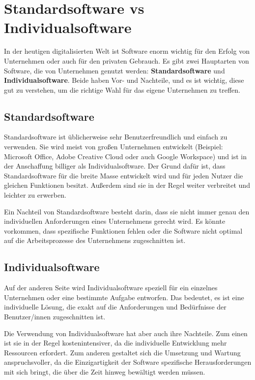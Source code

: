 \section {Standardsoftware vs Individualsoftware}

In der heutigen digitalisierten Welt ist Software enorm wichtig für den Erfolg von Unternehmen 
oder auch für den privaten Gebrauch.
Es gibt zwei Hauptarten von Software, die von Unternehmen genutzt werden: \textbf{Standardsoftware} und 
\textbf{Individualsoftware}.
Beide haben Vor- und Nachteile, und es ist wichtig, 
diese gut zu verstehen, um die richtige Wahl für das eigene Unternehmen zu treffen.

\subsection*{Standardsoftware}

Standardsoftware ist üblicherweise sehr Benutzerfreundlich und einfach zu verwenden. 
Sie wird meist von großen Unternehmen entwickelt 
(Beispiel: Microsoft Office, Adobe Creative Cloud oder auch Google Workspace) 
und ist in der Anschaffung billiger als Individualsoftware. 
Der Grund dafür ist, dass Standardsoftware für die breite Masse entwickelt wird 
und für jeden Nutzer die gleichen Funktionen besitzt. 
Außerdem sind sie in der Regel weiter verbreitet und leichter zu erwerben.

Ein Nachteil von Standardsoftware besteht darin, dass sie nicht immer genau 
den individuellen Anforderungen eines Unternehmens gerecht wird. 
Es könnte vorkommen, dass spezifische Funktionen fehlen oder die Software 
nicht optimal auf die Arbeitsprozesse des Unternehmens zugeschnitten ist. 
\newpage
\subsection*{Individualsoftware}

Auf der anderen Seite wird Individualsoftware speziell für ein einzelnes 
Unternehmen oder eine bestimmte Aufgabe entworfen. 
Das bedeutet, es ist eine individuelle Lösung, die exakt auf 
die Anforderungen und Bedürfnisse der Benutzer/innen zugeschnitten ist.

Die Verwendung von Individualsoftware hat aber auch ihre Nachteile. 
Zum einen ist sie in der Regel kostenintensiver, da die individuelle Entwicklung 
mehr Ressourcen erfordert. Zum anderen gestaltet sich die Umsetzung und Wartung 
anspruchsvoller, da die Einzigartigkeit der Software spezifische Herausforderungen 
mit sich bringt, die über die Zeit hinweg bewältigt werden müssen.

